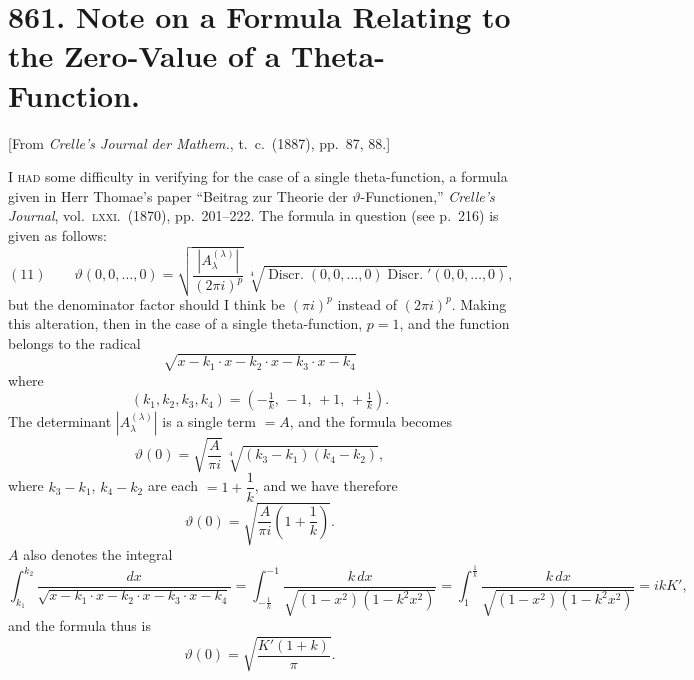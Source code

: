 \documentclass[11pt]{article}
\begin{document}
\vfill
\newpage

\section*{861. Note on a Formula Relating to the Zero-Value of a Theta-Function.}

\begin{flushright}\small
[From \textit{Crelle's Journal der Mathem.}, t.~c.\ (1887), pp.~87, 88.]
\end{flushright}

\medskip

\noindent\textsc{I had} some difficulty in verifying for the case of a single theta-function, a formula given in Herr Thomae's paper ``Beitrag zur Theorie der $\vartheta$-Functionen,'' \textit{Crelle's Journal}, vol.~\textsc{lxxi}.\ (1870), pp.~201--222. The formula in question (see p.~216) is given as follows:
\[
(11)\qquad
\vartheta(0,0,\ldots,0)
= \sqrt{\frac{|A^{(\lambda)}_{\lambda}|}{(2\pi i)^{p}}}\,
  \sqrt[4]{\operatorname{Discr.}(0,0,\ldots,0)\operatorname{Discr.}'(0,0,\ldots,0)},
\]
but the denominator factor should I think be $(\pi i)^{p}$ instead of $(2\pi i)^{p}$. Making this alteration, then in the case of a single theta-function, $p=1$, and the function belongs to the radical
\[
\sqrt{x-k_{1}\cdot x-k_{2}\cdot x-k_{3}\cdot x-k_{4}}
\]
where
\[
(k_{1},k_{2},k_{3},k_{4}) = \left(-\tfrac{1}{k},\,-1,\,+1,\,+\tfrac{1}{k}\right).
\]
The determinant $|A^{(\lambda)}_{\lambda}|$ is a single term $=A$, and the formula becomes
\[
\vartheta(0) = \sqrt{\frac{A}{\pi i}}\,\sqrt[4]{(k_{3}-k_{1})(k_{4}-k_{2})},
\]
where $k_{3}-k_{1}$, $k_{4}-k_{2}$ are each $=1+\dfrac{1}{k}$, and we have therefore
\[
\vartheta(0) = \sqrt{\frac{A}{\pi i}\left(1+\frac{1}{k}\right)}.
\]
$A$ also denotes the integral
\[
\int_{k_{1}}^{k_{2}} \frac{dx}{\sqrt{x-k_{1}\cdot x-k_{2}\cdot x-k_{3}\cdot x-k_{4}}}
= \int_{-\frac{1}{k}}^{-1} \frac{k\,dx}{\sqrt{(1-x^{2})(1-k^{2}x^{2})}}
= \int_{1}^{\frac{1}{k}} \frac{k\,dx}{\sqrt{(1-x^{2})(1-k^{2}x^{2})}}
= ikK',
\]
and the formula thus is
\[
\vartheta(0) = \sqrt{\frac{K'(1+k)}{\pi}}.
\]
\end{document}
